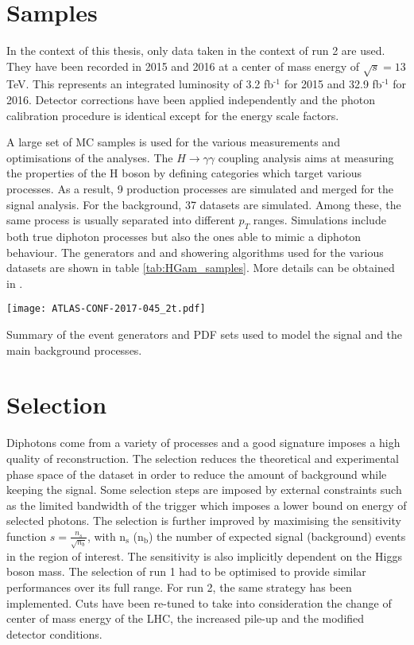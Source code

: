 \section{Samples}
\label{sec:org8347df9}

In the context of this thesis, only data taken in the context of run 2 are used.
They have been recorded in 2015 and 2016 at a center of mass energy of \(\sqrt{s}=13\) TeV.
This represents an integrated luminosity of 3.2 fb\(^{\text{-1}}\) for 2015 and 32.9 fb\(^{\text{-1}}\) for 2016.
Detector corrections have been applied independently and the photon calibration procedure is identical except for the energy scale factors.

A large set of MC samples is used for the various measurements and optimisations of the analyses.
The $H\rightarrow\gamma\gamma$ coupling analysis \cite{ATLAS-CONF-2017-045} aims at measuring the properties of the H boson by defining categories which target various processes.
As a result, 9 production processes are simulated and merged for the signal analysis.
For the background, 37 datasets are simulated.
Among these, the same process is usually separated into different $p_T$ ranges.
Simulations include both true diphoton processes but also the ones able to mimic a diphoton behaviour.
The generators and and showering algorithms used for the various datasets are shown in table \ref{tab:HGam_samples}.
More details can be obtained in \cite{ATL-COM-PHYS-2016-1784,ATLAS-CONF-2017-045}.

\begin{table}[h!]
  \texttt{[image: ATLAS-CONF-2017-045\_2t.pdf]}
  \caption{Summary of the event generators and PDF sets used to model the signal and the main background processes. \cite{ATLAS-CONF-2017-045}}
  \label{tab:HGam_samples}
\end{table}

\section{Selection}
\label{sec:org173b38f}

Diphotons  come from a variety of processes and a good signature imposes a high quality of reconstruction.
The selection reduces the theoretical and experimental phase space of the dataset in order to reduce the amount of background while keeping the signal.
Some selection steps are imposed by external constraints such as the limited bandwidth of the trigger which imposes a lower bound on energy of selected photons.
The selection is further improved by maximising the sensitivity function \(s=\frac{n_s}{\sqrt{n_b}}\), with n\(_{\text{s}}\) (n\(_{\text{b}}\)) the number of expected signal (background) events in the region of interest.
The sensitivity is also implicitly dependent on the Higgs boson mass.
The selection of run 1 had to be optimised to provide similar performances over its full range.
For run 2, the same strategy has been implemented.
Cuts have been re-tuned to take into consideration the change of center of mass energy of the LHC, the increased pile-up and the modified detector conditions.

